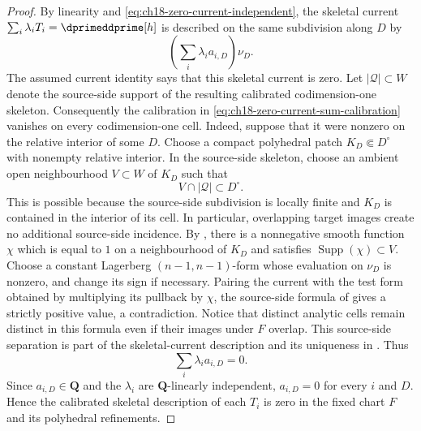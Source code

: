 \begin{proof}
By linearity and \eqref{eq:ch18-zero-current-independent}, the skeletal
current \(\sum_i\lambda_iT_i=\dprimeddprime[h]\) is described on the same
subdivision along \(D\) by
\begin{equation}
\label{eq:ch18-zero-current-sum-calibration}
                         \left(\sum_i\lambda_i a_{i,D}\right)\nu_D.
\end{equation}
The assumed current identity says that this skeletal current is zero.  Let
\(|\mathscr Q|\subset W\) denote the source-side support of the resulting
calibrated codimension-one skeleton.  Consequently the calibration in
\eqref{eq:ch18-zero-current-sum-calibration} vanishes on every
codimension-one cell.  Indeed, suppose that it were nonzero on the relative
interior of some \(D\).  Choose a compact polyhedral patch
\(K_D\Subset D^\circ\) with nonempty relative interior.  In the source-side
skeleton, choose an ambient open neighbourhood \(V\subset W\) of \(K_D\) such
that
\[
                         V\cap|\mathscr Q|\subset D^\circ.
\]
This is possible because the source-side subdivision is locally finite and
\(K_D\) is contained in the interior of its cell.  In particular, overlapping
target images create no additional source-side incidence.  By
\cite[Corollary~6.2.4]{CLD25}, there is a nonnegative smooth function \(\chi\)
which is equal to \(1\) on a neighbourhood of \(K_D\) and satisfies
\(\operatorname{Supp}(\chi)\subset V\).
Choose a constant Lagerberg \((n-1,n-1)\)-form whose evaluation on \(\nu_D\) is
nonzero, and change its sign if necessary.  Pairing the current with the
test form obtained by multiplying its pullback by \(\chi\), the source-side
formula of \cite[Definition~7.5.1]{CLD25} gives a strictly positive value, a
contradiction.  Notice that distinct analytic cells remain distinct in this
formula even if their images under \(F\) overlap.  This source-side separation
is part of the skeletal-current description and its uniqueness in
\cite[Definition~7.5.1 and Propositions~7.5.7--7.5.8]{CLD25}.  Thus
\[
                         \sum_i\lambda_i a_{i,D}=0.
\]
Since \(a_{i,D}\in\mathbf Q\) and the \(\lambda_i\) are \(\mathbf Q\)-linearly
independent, \(a_{i,D}=0\) for every \(i\) and \(D\).  Hence the calibrated
skeletal description of each \(T_i\) is zero in the fixed chart \(F\) and its
polyhedral refinements.


\end{proof}
